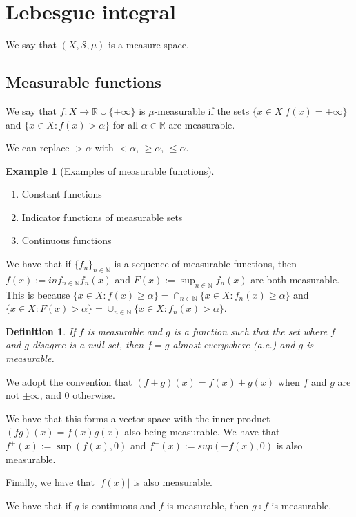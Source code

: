 \documentclass{article}
\newtheorem{definition}[theorem]{Definition}
\theoremstyle{definition}
\newtheorem{example}[theorem]{Example}
\numberwithin{theorem}{section}
\numberwithin{equation}{section}
\begin{document}
\section{Lebesgue integral}
We say that $(X, \mathcal{S}, \mu)$ is a measure space. 
\subsection{Measurable functions}
We say that $f: X \rightarrow \mathbb{R} \cup \lbrace \pm \infty \rbrace$ is $\mu$-measurable if the sets $\lbrace x \in X | f(x) = \pm \infty \rbrace$ and $\lbrace x \in X : f(x) > \alpha \rbrace$ for all $\alpha \in \mathbb{R}$ are measurable. 

We can replace $> \alpha$ with $< \alpha$, $\geq \alpha$, $\leq \alpha$.
\begin{example}[Examples of measurable functions]
	\begin{enumerate}
		\item Constant functions
		\item Indicator functions of measurable sets
		\item Continuous functions
	\end{enumerate}
\end{example}
We have that if $\lbrace f_n \rbrace_{n \in \mathbb{N}}$ is a sequence of measurable functions, then $f(x) := inf_{n \in \mathbb{N}} f_n(x)$ and $F(x) := \sup_{n \in \mathbb{N}} f_n(x)$ are both measurable. 
This is because $\lbrace x \in X : f(x) \geq \alpha \rbrace = \cap_{n \in \mathbb{N}} \lbrace x \in X : f_n(x) \geq \alpha \rbrace$ and $\lbrace x \in X : F(x) > \alpha \rbrace = \cup_{n \in \mathbb{N}} \lbrace x \in X : f_n(x) > \alpha \rbrace$.

\begin{definition}
	If $f$ is measurable and $g$ is a function such that the set where $f$ and $g$ disagree is a null-set, then $f = g$ almost everywhere (a.e.) and $g$ is measurable. 
\end{definition} 
We adopt the convention that $(f + g) (x) = f(x) + g(x)$ when $f$ and $g$ are not $\pm \infty$, and 0 otherwise.

We have that this forms a vector space with the inner product $(fg)(x) = f(x)g(x)$ also being measurable. We have that $f^+(x) := \sup(f(x), 0)$ and $f^-(x) := sup(-f(x), 0)$ is also measurable. 

Finally, we have that $|f(x)| $ is also measurable. 

We have that if $g$ is continuous and $f$ is measurable, then $g \circ f$ is measurable. 
\end{document}
